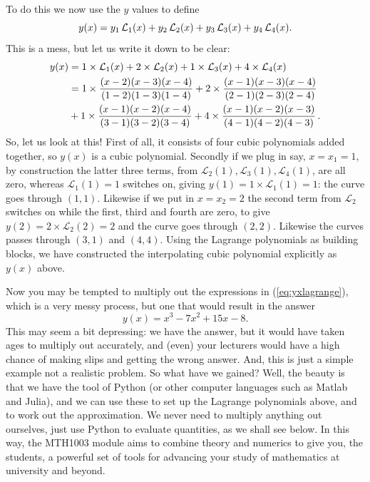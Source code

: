 To do this we now use the $y$ values to define
%
\begin{equation}
y(x) = y_1 \, \mathcal{L}_1 (x)  + y_2 \, \mathcal{L}_2 (x)  + y_3 \, \mathcal{L}_3 (x)  + y_4 \, \mathcal{L}_4 (x)  .\notag
\end{equation}
%
This is a mess, but let us write it down to be clear:
%
\begin{align}
y(x) & = 1 \times  \mathcal{L}_1 (x)  + 2\times  \mathcal{L}_2 (x)  + 1\times \mathcal{L}_3 (x)  + 4 \times \mathcal{L}_4 (x) \notag \\
& = 
1 \times \frac{(x-2)(x-3)(x-4)}{ (1-2)(1-3)(1-4)}
+ 2\times \frac{(x-1)(x-3)(x-4)}{ (2-1)(2-3)(2-4)} \notag\\
& + 1 \times  \frac{(x-1)(x-2)(x-4)}{ (3-1)(3-2)(3-4)}  
+ 4 \times\frac{(x-1)(x-2)(x-3)}{ (4-1)(4-2)(4-3)}\, .
\label{eq:yxlagrange}
\end{align}
%
So, let us look at this! First of all, it consists of four cubic polynomials added together, so $y(x)$ is a cubic polynomial. Secondly if we plug in 
say, $x=x_1=1$, by construction the latter three terms, from $\mathcal{L}_2(1), \mathcal{L}_3(1), \mathcal{L}_4(1)$, are all zero, whereas $\mathcal{L}_1(1)=1$ switches on, giving
$y(1) = 1 \times  \mathcal{L}_1(1) = 1$: the curve goes through $(1,1)$. Likewise if we put in $x=x_2=2$ the second term from  $\mathcal{L}_2$ 
switches on while the first, third and fourth are zero, to give $y(2) = 2 \times \mathcal{L}_2(2) = 2$ and the curve goes through $(2,2)$. Likewise the curves passes through $(3,1)$ and $(4,4)$. Using the Lagrange polynomials as building blocks, we have constructed the interpolating cubic polynomial explicitly as $y(x)$ above. 

Now you may be tempted to multiply out the expressions in (\ref{eq:yxlagrange}), which is a very messy process, but one that would result in the 
answer
%
\begin{equation}
 y(x)  = x^3 - 7 x^2 + 15 x - 8. 
\end{equation}
%
%
%
This may seem a bit depressing: we have the answer, but it would have taken ages to multiply out accurately, and (even) your lecturers would have a high
chance of making slips and getting the wrong answer. And, this is just a simple example not a realistic problem. So what have we gained? Well, the beauty is that we have the 
tool of Python (or other computer languages such as Matlab and Julia), and we can use these to set up the Lagrange polynomials above, and to work out the approximation. We 
never need to multiply anything out ourselves, just use Python to evaluate quantities, as we shall see below. In this way, the MTH1003 module aims to combine theory and numerics to give
you, the students, a powerful set of tools for advancing your study of mathematics at university and beyond. 

